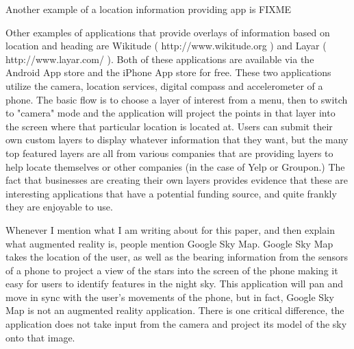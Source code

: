 \documentclass{acm_proc_article-sp}
\begin{document}
Another example of a location information providing app is FIXME

Other examples of applications that provide overlays of information based on location and heading are Wikitude ( http://www.wikitude.org ) and Layar ( http://www.layar.com/ ).  Both of these applications are available via the Android App store and the iPhone App store for free.  These two applications utilize the camera, location services, digital compass and accelerometer of a phone.  The basic flow is to choose a layer of interest from a menu, then to switch to "camera" mode and the application will project the points in that layer into the screen where that particular location is located at.  Users can submit their own custom layers to display whatever information that they want, but the many top featured layers are all from various companies that are providing layers to help locate themselves or other companies (in the case of Yelp or Groupon.)  The fact that businesses are creating their own layers provides evidence that these are interesting applications that have a potential funding source, and quite frankly they are enjoyable to use.

Whenever I mention what I am writing about for this paper, and then explain what augmented reality is, people mention Google Sky Map.  Google Sky Map takes the location of the user, as well as the bearing information from the sensors of a phone to project a view of the stars into the screen of the phone making it easy for users to identify features in the night sky. This application will pan and move in sync with the user's movements of the phone, but in fact, Google Sky Map is not an augmented reality application.  There is one critical difference, the application does not take input from the camera and project its model of the sky onto that image. \cite{Ouilhet:2010:GSM:1851600.1851695}
\end{document}
